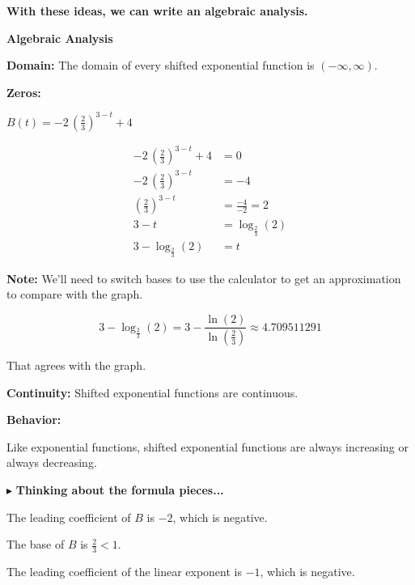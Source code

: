 \documentclass{ximera}
\begin{document}
\begin{example}
\textbf{\textcolor{red!75!green}{With these ideas, we can write an algebraic analysis.}} 




\textbf{\textcolor{purple!65!blue}{Algebraic Analysis}}



\textbf{Domain:} The domain of every shifted exponential function is $(-\infty, \infty)$. 



\textbf{Zeros:}  



$B(t) = -2 \, \left( \frac{2}{3} \right)^{3-t} + 4$ 


\begin{align*}
-2 \, \left( \frac{2}{3} \right)^{3-t} + 4 & = 0 \\
-2 \, \left( \frac{2}{3} \right)^{3-t}  & = -4 \\
\left( \frac{2}{3} \right)^{3-t} & = \frac{-4}{-2} = 2 \\
3-t & = \log_{\tfrac{2}{3}}(2)\\
3 - \log_{\tfrac{2}{3}}(2) & = t
\end{align*}

\textbf{Note:}  We'll need to switch bases to use the calculator to get an approximation to compare with the graph.



\[
3 - \log_{\tfrac{2}{3}}(2) = 3 - \frac{\ln(2)}{\ln\left( \frac{2}{3}  \right)} \approx 4.709511291  
\]


That agrees with the graph. 




\textbf{Continuity:}  Shifted exponential functions are continuous.  








\textbf{Behavior:} 

Like exponential functions, shifted exponential functions are always increasing or always decreasing. 




$\blacktriangleright$ \textbf{Thinking about the formula pieces...}

The leading coefficient of $B$ is $-2$, which is negative. 

The base of $B$ is $\frac{2}{3} < 1$.

The leading coefficient of the linear exponent is $-1$, which is negative.  




\end{example}
\end{document}
